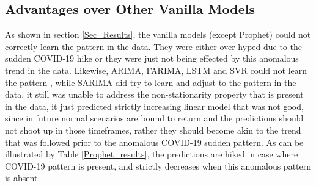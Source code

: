 \documentclass[times,twocolumn,final,authoryear]{elsarticle}
\begin{document}
	\subsection{Advantages over Other Vanilla Models}
	As shown in section \ref{Sec_Results}, the vanilla models (except Prophet) could not correctly learn the pattern in the data. They were either over-hyped due to the sudden COVID-19 hike or they were just not being effected by this anomalous trend in the data. Likewise, ARIMA, FARIMA, LSTM and SVR could not learn the pattern , while SARIMA did try to learn and adjust to the pattern in the data, it still was unable to address the non-stationarity property that is present in the data, it just predicted strictly increasing linear model that was not good, since in future normal scenarios are bound to return and the predictions should not shoot up in those timeframes, rather they should become akin to the trend that was followed prior to the anomalous COVID-19 sudden pattern. As can be illustrated by Table \ref{Prophet_results}, the predictions are hiked in case where COVID-19 pattern is present, and strictly decreases when this anomalous pattern is absent. 
	
\end{document}
